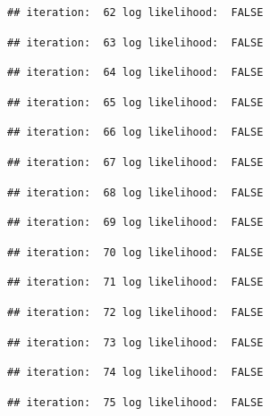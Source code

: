 \documentclass[
]{article}
\begin{document}
\begin{lstlisting}
## iteration:  62 log likelihood:  FALSE
\end{lstlisting}

\begin{lstlisting}
## iteration:  63 log likelihood:  FALSE
\end{lstlisting}

\begin{lstlisting}
## iteration:  64 log likelihood:  FALSE
\end{lstlisting}

\begin{lstlisting}
## iteration:  65 log likelihood:  FALSE
\end{lstlisting}

\begin{lstlisting}
## iteration:  66 log likelihood:  FALSE
\end{lstlisting}

\begin{lstlisting}
## iteration:  67 log likelihood:  FALSE
\end{lstlisting}

\begin{lstlisting}
## iteration:  68 log likelihood:  FALSE
\end{lstlisting}

\begin{lstlisting}
## iteration:  69 log likelihood:  FALSE
\end{lstlisting}

\begin{lstlisting}
## iteration:  70 log likelihood:  FALSE
\end{lstlisting}

\begin{lstlisting}
## iteration:  71 log likelihood:  FALSE
\end{lstlisting}

\begin{lstlisting}
## iteration:  72 log likelihood:  FALSE
\end{lstlisting}

\begin{lstlisting}
## iteration:  73 log likelihood:  FALSE
\end{lstlisting}

\begin{lstlisting}
## iteration:  74 log likelihood:  FALSE
\end{lstlisting}

\begin{lstlisting}
## iteration:  75 log likelihood:  FALSE
\end{lstlisting}
\end{document}
